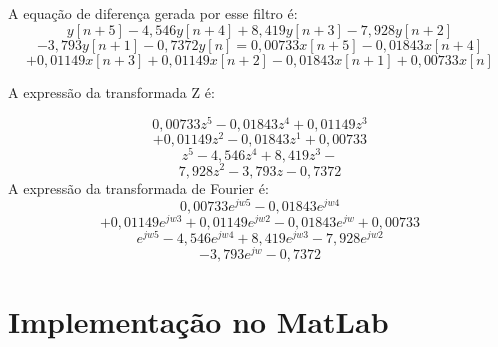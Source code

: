 \documentclass[a4paper,10pt]{article}
\begin{document}



 

A equação de diferença gerada por esse filtro é: 
\[y[n+5] - 4,546y[n+4] + 8,419y[n+3] - 7,928y[n+2] \]
\[- 3,793y[n+1] - 0,7372y[n] = 0,00733x[n+5] - 0,01843x[n+4]\]
\[ + 0,01149x[n+3] + 0,01149x[n+2] - 0,01843x[n+1] + 0,00733x[n] \]

A expressão da transformada Z é:

\[0,00733z^5 - 0,01843z^4 + 0,01149z^3\]
\[+ 0,01149z^2 - 0,01843z^1 + 0,00733 \]
\hline
\[ z^5 - 4,546z^4 + 8,419z^3 - \]
\[7,928z^2 - 3,793z - 0,7372 \]
A expressão da transformada de Fourier é:
\[0,00733e^{jw5} - 0,01843e^{jw4}\]
\[ + 0,01149e^{jw3} + 0,01149e^{jw2} - 0,01843e^{jw} + 0,00733 \]
\hline
\[ e^{jw5} - 4,546e^{jw4} + 8,419e^{jw3} - 7,928e^{jw2}\] 
\[ - 3,793e^{jw} - 0,7372\]

\section{Implementação no MatLab}

\end{document}

